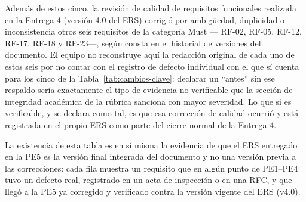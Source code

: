 \documentclass[journal,onecolumn]{IEEEtran}
\begin{document}
Además de estos cinco, la revisión de calidad de requisitos funcionales
realizada en la Entrega 4 (versión 4.0 del ERS) corrigió por ambigüedad,
duplicidad o inconsistencia otros seis requisitos de la categoría Must ---
RF-02, RF-05, RF-12, RF-17, RF-18 y RF-23---, según consta en el historial de
versiones del documento. El equipo no reconstruye aquí la redacción original
de cada uno de estos seis por no contar con el registro de defecto
individual con el que sí cuenta para los cinco de la Tabla~\ref{tab:cambios-clave}:
declarar un ``antes'' sin ese respaldo sería exactamente el tipo de
evidencia no verificable que la sección de integridad académica de la
rúbrica sanciona con mayor severidad. Lo que sí es verificable, y se declara
como tal, es que esa corrección de calidad ocurrió y está registrada en el
propio ERS como parte del cierre normal de la Entrega 4.

La existencia de esta tabla es en sí misma la evidencia de que el ERS
entregado en la PE5 es la versión final integrada del documento y no una
versión previa a las correcciones: cada fila muestra un requisito que en
algún punto de PE1--PE4 tuvo un defecto real, registrado en un acta de
inspección o en una RFC, y que llegó a la PE5 ya corregido y verificado
contra la versión vigente del ERS (v4.0).

\printbibliography[heading=none]
\end{document}
